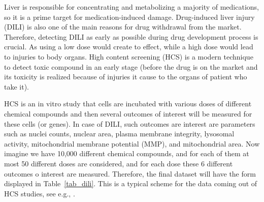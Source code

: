\documentclass[11pt,a5paper,twoside]{book}
\begin{document}
Liver is responsible for concentrating and metabolizing a majority of medications, so it is a prime target for medication-induced damage. Drug-induced liver injury (DILI) is also one of the main reasons for drug withdrawal from the market. Therefore, detecting DILI as early as possible during drug development process is crucial. As using a low dose would create to effect, while a high dose would lead to injuries to body organs. High content screening (HCS) is a modern technique to detect toxic compound in an early stage (before the drug is on the market and its toxicity is realized because of injuries it cause to the organs of patient who take it). 

HCS is an in vitro study that cells are incubated with various doses of different chemical compounds and then several outcomes of interest will be measured for these cells (or genes). In case of DILI, such outcomes are interest are parameters such as nuclei counts, nuclear area, plasma membrane integrity, lysosomal activity, mitochondrial membrane potential (MMP), and mitochondrial area. Now imagine we have 10,000 different chemical compounds, and for each of them at most 50 different doses are considered, and for each dose these 6 different outcomes o interest are measured. Therefore, the final dataset will have the form displayed in Table~\ref{tab_dili}. This is a typical scheme for the data coming out of HCS studies, see e.g., \cite{kaliyaperumal2018pharmacogenomics}.
\end{document}
